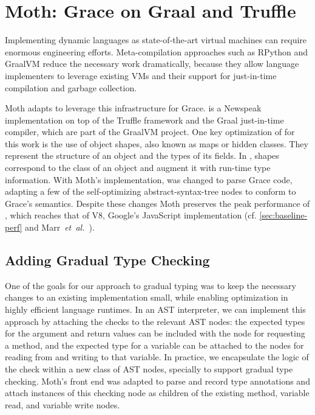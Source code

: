 
\section{Moth: Grace on Graal and Truffle}
\label{ssec:moth}
\label{sec:method}

Implementing dynamic languages as state-of-the-art virtual machines
can require enormous engineering efforts.
Meta-compilation approaches\citep{Marr:2015:MTPE}
such as RPython\citep{Bolz:2009:TMP,Bolz:2013:IMT}
and GraalVM\citep{Wurthinger2013,Wurthinger:2017:PPE}
reduce the necessary work dramatically,
because they allow language implementers to leverage existing VMs
and their support for just-in-time compilation and garbage collection.

Moth\citep{Roberts2017} adapts \SOMns\citep{SOMns} to leverage this infrastructure for Grace.
\SOMns is a Newspeak implementation\citep{Bracha:10:NS} on top of the Truffle framework and the Graal just-in-time compiler,
which are part of the GraalVM project.
One key optimization of \SOMns for this work is the use of
object shapes\citep{woss2014object},
also known as maps\citep{Self} or hidden classes.
They represent the structure of an object and the types of its fields.
In \SOMns, shapes correspond to the class of an object and augment it with
run-time type information.
%
%
With Moth's implementation,
\SOMns was changed to parse Grace code,
adapting a few of the self-optimizing abstract-syntax-tree nodes
to conform to Grace's semantics.
Despite these changes Moth
preserves the peak performance of \SOMns,
which reaches that of V8,
Google's JavaScript implementation
(cf. \cref{sec:baseline-perf} and Marr~\textit{et~al.}~\cite{Marr2016}).

\subsection{Adding Gradual Type Checking} 
\label{ssec:implementation} 



One of the goals for our approach to gradual typing was to keep
the necessary changes to an existing implementation small,
while enabling optimization in highly efficient language runtimes.
%
In an AST interpreter, we can implement this approach by attaching the
checks to the relevant AST nodes: the expected types for the argument
and return values can be included with the node for requesting a
method, and the expected type for a variable can be attached to the
nodes for reading from and writing to that variable.  In practice, we
encapsulate the logic of the check within a new class of AST
nodes, specially to support gradual type checking.  Moth's front end was adapted to parse and record type
annotations and attach instances of this checking node as children of the
existing method, variable read, and variable write nodes.


